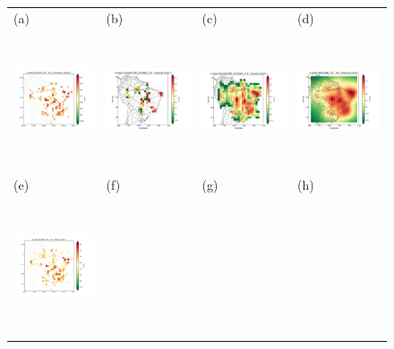 \documentclass[draft, grl]{agutex}
\begin{document}
\begin{figure}
	\begin{center}
	\begin{table}[H]
		\begin{tabular}{ p{}
						 p{}
						 p{}
						 p{} }
		\footnotesize(a) &
		\footnotesize(b) &
		\footnotesize(c) &
		\footnotesize(d)
		\\
		\includegraphics[height=4cm]{z_img_2dhist_assump_25}  &
		\includegraphics[height=4cm]{z_img_f_assump_50_25} &
		\includegraphics[height=4cm]{z_img_f_assump_150_25} &
		\includegraphics[height=4cm]{z_img_woo_assump_25} 
		\\
		\footnotesize(e) &
		\footnotesize(f) &
		\footnotesize(g) &
		\footnotesize(h)
		\\
		\includegraphics[height=4cm]{z_img_2dhist_stepp_25}  &

\end{tabular}
\end{table}
\end{center}
\end{figure}
\end{document}
